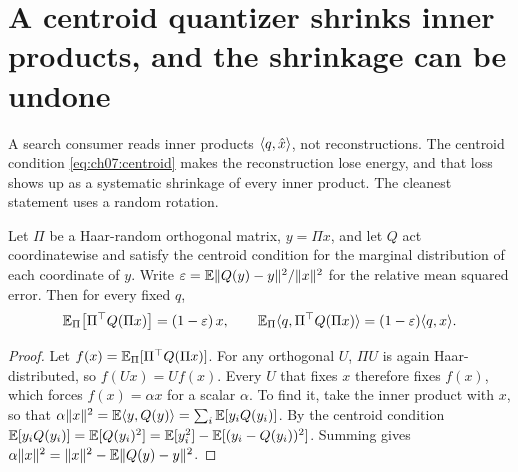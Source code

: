 

\section{A centroid quantizer shrinks inner products, and the shrinkage can be undone}\label{sec:ch07:bias}

A search consumer reads inner products $\langle q,\hat x\rangle$, not reconstructions. The centroid condition \cref{eq:ch07:centroid} makes the reconstruction lose energy, and that loss shows up as a systematic shrinkage of every inner product. The cleanest statement uses a random rotation.

\begin{proposition}\label{prop:ch07:shrink}
Let $\Pi$ be a Haar-random orthogonal matrix, $y=\Pi x$, and let $Q$ act coordinatewise and satisfy the centroid condition for the marginal distribution of each coordinate of $y$. Write $\varepsilon=\mathbb{E}\lVert Q(y)-y\rVert^2/\lVert x\rVert^2$ for the relative mean squared error. Then for every fixed $q$,
\begin{equation}\label{eq:ch07:shrink}
\mathbb{E}_\Pi\big[\Pi^{\top} Q(\Pi x)\big]=(1-\varepsilon)\,x,\qquad
\mathbb{E}_\Pi\langle q,\Pi^{\top} Q(\Pi x)\rangle=(1-\varepsilon)\langle q,x\rangle.
\end{equation}
\end{proposition}

\begin{proof}
Let $f(x)=\mathbb{E}_\Pi[\Pi^{\top} Q(\Pi x)]$. For any orthogonal $U$, $\Pi U$ is again Haar-distributed, so $f(Ux)=Uf(x)$. Every $U$ that fixes $x$ therefore fixes $f(x)$, which forces $f(x)=\alpha x$ for a scalar $\alpha$. To find it, take the inner product with $x$, so that $\alpha\lVert x\rVert^2=\mathbb{E}\langle y,Q(y)\rangle=\sum_i\mathbb{E}[y_iQ(y_i)]$. By the centroid condition $\mathbb{E}[y_iQ(y_i)]=\mathbb{E}[Q(y_i)^2]=\mathbb{E}[y_i^2]-\mathbb{E}[(y_i-Q(y_i))^2]$. Summing gives $\alpha\lVert x\rVert^2=\lVert x\rVert^2-\mathbb{E}\lVert Q(y)-y\rVert^2$.
\end{proof}

